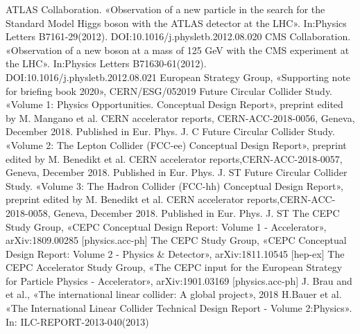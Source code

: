 \documentclass[a4paper,11pt,titlepage,oneside,openright]{book}	%
\begin{document}
	\begin{backmatter}
		
		\begin{thebibliography}{99}
			
			
			 ATLAS Collaboration. «Observation of a new particle in the search for the Standard Model Higgs boson with the ATLAS detector at the LHC». In:Physics Letters B7161-29(2012).   DOI:10.1016/j.physletb.2012.08.020
			 CMS Collaboration. «Observation of a new boson at a mass of 125 GeV with the CMS experiment at the LHC». In:Physics Letters B71630-61(2012).  DOI:10.1016/j.physletb.2012.08.021
			 European Strategy Group, «Supporting  note  for  briefing  book  2020», CERN/ESG/052019
			  Future Circular Collider Study. «Volume 1: Physics Opportunities. Conceptual Design Report»,  preprint  edited  by  M.  Mangano  et  al.  CERN  accelerator  reports,  CERN-ACC-2018-0056, Geneva, December 2018. Published in Eur. Phys. J. C
			 Future Circular Collider Study. «Volume 2: The Lepton Collider (FCC-ee) Conceptual Design  Report»,  preprint  edited  by  M.  Benedikt  et  al.  CERN  accelerator  reports,CERN-ACC-2018-0057, Geneva, December 2018. Published in Eur. Phys. J. ST
			 Future Circular Collider Study. «Volume 3:  The Hadron Collider (FCC-hh) Conceptual Design Report», preprint edited by M. Benedikt et al. CERN accelerator reports,CERN-ACC-2018-0058, Geneva, December 2018. Published in Eur. Phys. J. ST
			 The CEPC Study Group, «CEPC Conceptual Design Report: Volume 1 - Accelerator», arXiv:1809.00285 [physics.acc-ph]
			 The CEPC Study Group, «CEPC Conceptual Design Report:  Volume 2 - Physics \& Detector», arXiv:1811.10545 [hep-ex]
			 The CEPC Accelerator Study Group, «The CEPC input for the European Strategy for Particle Physics - Accelerator», arXiv:1901.03169 [physics.acc-ph]
			  J.   Brau   and   et   al., «The   international   linear   collider: A   global   project», 2018
			 H.Bauer et al. «The International Linear Collider Technical Design Report - Volume 2:Physics». In: ILC-REPORT-2013-040(2013)

\end{thebibliography}
\end{backmatter}
\end{document}
